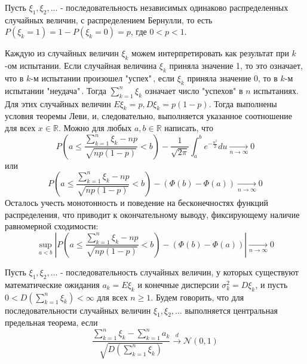 \begin{theorem}
	Пусть $\xi_1, \xi_2, \dots$ - последовательность независимых одинаково распределенных случайных величин, с распределением Бернулли, то есть $P (\xi_k = 1) = 1 - P(\xi_k = 0) = p$, где $0 < p < 1$.
	
	Каждую из случайных величин $\xi_k$ можем интерпретировать как результат при $k$-ом испытании. Если случайная величина $\xi_k$ приняла значение 1, то это означает, что в $k$-м испытании произошел "успех"\,, если $\xi_k$ приняла значение 0, то в $k$-м испытании "неудача"\,. Тогда $\sum\limits_{k=1}^{n} \xi_k$ означает число "успехов" в $n$ испытаниях. Для этих случайных величин $E\xi_k = p, D\xi_k = p(1-p)$. Тогда выполнены условия теоремы Леви, и, следовательно, выполняется указанное соотношение для всех $x \in \mathbb{R}$. Можно для любых $a, b \in \mathbb{R}$ написать, что
	\[ P \left( a \le \frac{\sum\limits_{k=1}^{n} \xi_k - np}{\sqrt{np (1-p)}} < b \right) - \frac{1}{\sqrt{2 \pi}} \int_{a}^{b} e^{- \frac{u^2}{2}} du \underset{n \to \infty}{\to} 0 \]
	или
	\[ P \left( a \le \frac{\sum\limits_{k=1}^{n} \xi_k - np}{\sqrt{np (1-p)}} < b \right) - (\Phi(b) - \Phi(a)) \underset{n \to \infty}{\to} 0 \]
	Осталось учесть монотонность и поведение на бесконечностях функций распределения, что приводит к окончательному выводу, фиксирующему наличие равномерной сходимости:
	\[ \sup_{a < b} \left| P \left( a \le \frac{\sum\limits_{k=1}^{n} \xi_k - np}{\sqrt{np (1-p)}} < b \right) - (\Phi(b) - \Phi(a)) \right| \underset{n \to \infty}{\to} 0 \]
\end{theorem}

\begin{definition}
	Пусть $\xi_1, \xi_2, \dots$ - последовательность случайных величин, у которых существуют математические ожидания $a_k = E\xi_k$ и конечные дисперсии $\sigma_k^2 = D\xi_k$, и пусть $0 < D \left( \sum\limits_{k=1}^{n} \xi_k \right) < \infty$ для всех $n \ge 1$. Будем говорить, что для последовательности случайных величин $\xi_1, \xi_2, \dots$ выполняется центральная предельная теорема, если
	\[ \frac{\sum\limits_{k=1}^{n} \xi_k - \sum\limits_{k=1}^{n} a_k}{\sqrt{D \left( \sum\limits_{k=1}^{n} \xi_k \right)}} \overset{d}{\to} \mathcal{N} (0, 1) \]
\end{definition}

